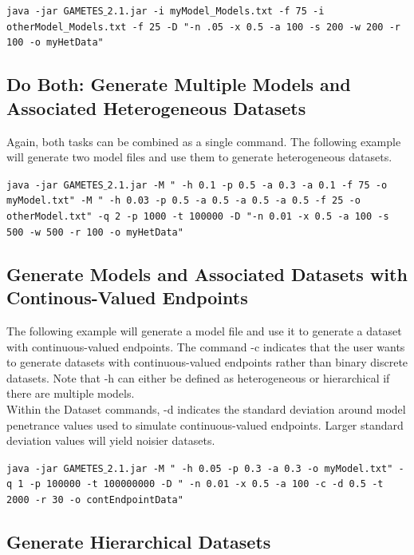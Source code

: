 \documentclass{report}
\begin{document}
\begin{center}
\texttt{java -jar GAMETES$\_$2.1.jar -i myModel\_Models.txt -f 75 -i otherModel\_Models.txt -f 25 -D "-n .05 -x 0.5 -a 100 -s 200 -w 200 -r 100 -o myHetData"}
\end{center}

\subsection{Do Both: Generate Multiple Models and Associated Heterogeneous Datasets}
Again, both tasks can be combined as a single command.  The following example will generate two model files and use them to generate heterogeneous datasets.

\begin{center}
\texttt{java -jar GAMETES$\_$2.1.jar -M " -h 0.1 -p 0.5 -a 0.3 -a 0.1 -f 75 -o myModel.txt" -M " -h 0.03 -p 0.5 -a 0.5 -a 0.5 -a 0.5 -f 25 -o otherModel.txt" -q 2 -p 1000 -t 100000 -D "-n 0.01 -x 0.5 -a 100 -s 500 -w 500 -r 100 -o myHetData"}
\end{center}

\subsection{Generate Models and Associated Datasets with Continous-Valued Endpoints}
The following example will generate a model file and use it to generate a dataset with continuous-valued endpoints.
The command -c indicates that the user wants to generate datasets with continuous-valued endpoints rather than binary discrete datasets. Note that -h can either be defined as heterogeneous or hierarchical if there are multiple models. \\
Within the Dataset commands, -d indicates the standard deviation around model penetrance values used to simulate continuous-valued endpoints. Larger standard deviation values will yield noisier datasets.

\begin{center}
\texttt{java -jar GAMETES$\_$2.1.jar -M " -h 0.05 -p 0.3 -a 0.3  -o myModel.txt" -q 1 -p 100000 -t 100000000 -D " -n 0.01 -x 0.5 -a 100 -c -d 0.5 -t 2000 -r 30 -o contEndpointData"}
\end{center}

\subsection{Generate Hierarchical Datasets}
\end{document}
